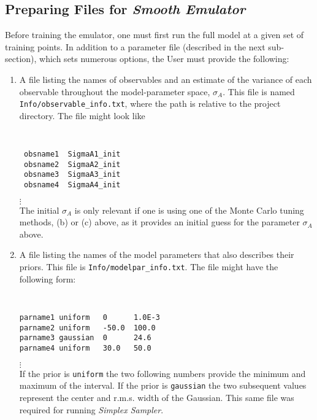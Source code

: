 \documentclass[UserManual.tex]{subfiles}
\begin{document}
\subsection{Preparing Files for {\it Smooth Emulator}}

Before training the emulator, one must first run the full model at a given set of training points. In addition to a parameter file (described in the next sub-section), which sets numerous options, the User must provide the following:
\begin{enumerate}\itemsep=0pt
\item A file listing the names of observables and an estimate of the variance of each observable throughout the model-parameter space, $\sigma_A$. This file is named {\tt Info/observable\_info.txt}, where the path is relative to the project directory. The file might look like
{\tt
\begin{verbatim}
 obsname1  SigmaA1_init
 obsname2  SigmaA2_init
 obsname3  SigmaA3_init
 obsname4  SigmaA4_init 
\end{verbatim}}
\vspace*{-16pt}
 \hspace*{28pt}$\vdots$\\
The initial $\sigma_A$ is only relevant if one is using one of the Monte Carlo tuning methods, (b) or (c) above, as it provides an initial guess for the parameter $\sigma_A$ above.

\item A file listing the names of the model parameters that also describes their priors. This file is {\tt Info/modelpar\_info.txt}. The file might have the following form:
{\tt
\begin{verbatim}
parname1 uniform   0      1.0E-3
parname2 uniform   -50.0  100.0
parname3 gaussian  0      24.6
parname4 uniform   30.0   50.0
\end{verbatim}}
\vspace*{-16pt}
 \hspace*{28pt}$\vdots$\\
If the prior is {\tt uniform} the two following numbers provide the minimum and maximum of the interval. If the prior is {\tt gaussian} the two subsequent values represent the center and r.m.s. width of the Gaussian. This same file was required for running {\it Simplex Sampler}.


\end{enumerate}
\end{document}
